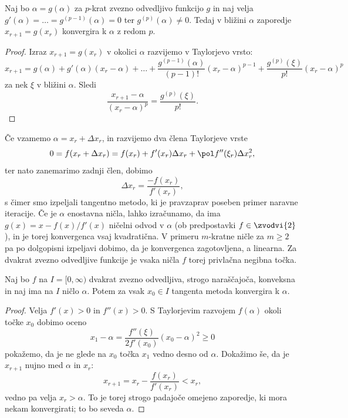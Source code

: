 \begin{izrek}
  Naj bo $\alpha = g(\alpha)$ za $p$-krat zvezno odvedljivo funkcijo $g$ in naj
  velja $g'(\alpha) = \ldots = g^{(p-1)}(\alpha) = 0$ ter $g^{(p)}(\alpha) \ne
  0$.
  Tedaj v bližini $\alpha$ zaporedje $x_{r+1} = g(x_r)$ konvergira k $\alpha$ z
  redom $p$.
\end{izrek}

\begin{proof}
  Izraz $x_{r+1} = g(x_r)$ v okolici $\alpha$ razvijemo v Taylorjevo vrsto:
  \[
	x_{r+1} = g(\alpha) + g'(\alpha) (x_r - \alpha) + \ldots +
	\frac{g^{(p-1)}(\alpha)}{(p-1)!}(x_r - \alpha)^{p-1}
	+ \frac{g^{(p)}(\xi)}{p!} (x_r - \alpha)^p
  \]
  za nek $\xi$ v bližini $\alpha$.
  Sledi
  \[
	\frac{x_{r+1}-\alpha}{(x_r - \alpha)^p} = \frac{g^{(p)}(\xi)}{p!}.
  \]
\end{proof}



Če vzamemo $\alpha = x_r + \Delta x_r$, in razvijemo dva člena Taylorjeve vrste
\[
  0 = f(x_r + \Delta x_r) = f(x_r) + f'(x_r) \Delta x_r + \pol f''(\xi_r) \Delta x_r^2,
\]
ter nato zanemarimo zadnji člen, dobimo
\[
  \Delta x_r = \frac{- f(x_r)}{f'(x_r)},
\]
s čimer smo izpeljali tangentno metodo, ki je pravzaprav poseben primer naravne
iteracije.
Če je $\alpha$ enostavna ničla, lahko izračunamo, da ima $g(x) = x - f(x) /
f'(x)$ ničelni odvod v $\alpha$ (ob predpostavki $f \in \zvodvi{2}$), in je
torej konvergenca vsaj kvadratična.
V primeru $m$-kratne ničle za $m \ge 2$ pa po dolgopisni izpeljavi dobimo, da je
konvergenca zagotovljena, a linearna.
Za dvakrat zvezno odvedljive funkcije je vsaka ničla $f$ torej privlačna negibna
točka.


\begin{izrek}
  Naj bo $f$ na $I = [0, \infty)$ dvakrat zvezno odvedljiva, strogo naraščajoča,
  konveksna in naj ima na $I$ ničlo $\alpha$.
  Potem za vsak $x_0 \in I$ tangenta metoda konvergira k $\alpha$.
\end{izrek}

\begin{proof}
  Velja $f'(x) > 0$ in $f''(x) > 0$.
  S Taylorjevim razvojem $f(\alpha)$ okoli točke $x_0$ dobimo oceno
  \[
	x_1 - \alpha = \frac{f''(\xi)}{2f'(x_0)} (x_0 - \alpha)^2 \ge 0
  \]
  pokažemo, da je ne glede na $x_0$ točka $x_1$ vedno desno od $\alpha$.
  Dokažimo še, da je $x_{r+1}$ nujno med $\alpha$ in $x_r$:
  \[
	x_{r+1} = x_r - \frac{f(x_r)}{f'(x_r)} < x_r,
  \]
  vedno pa velja $x_r > \alpha$.
  To je torej strogo padajoče omejeno zaporedje, ki mora nekam konvergirati; to
  bo seveda $\alpha$.
\end{proof}


